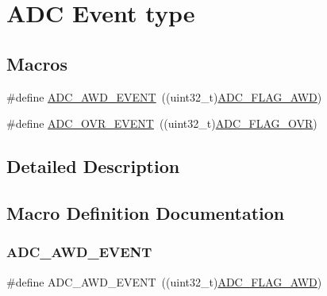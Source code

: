 \hypertarget{group___a_d_c___event__type}{}\section{A\+DC Event type}
\label{group___a_d_c___event__type}
\subsection*{Macros}
\begin{DoxyCompactItemize}
\item 
\#define \hyperlink{group___a_d_c___event__type_ga2d1d545ea1bfecba7a7081be6ef2cb93}{A\+D\+C\+\_\+\+A\+W\+D\+\_\+\+E\+V\+E\+NT}~((uint32\+\_\+t)\hyperlink{group___a_d_c__flags__definition_gadb75a4b430fb84950232b7a8f3a6a877}{A\+D\+C\+\_\+\+F\+L\+A\+G\+\_\+\+A\+WD})
\item 
\#define \hyperlink{group___a_d_c___event__type_gae1ef5aaecb2d24cac50a59f1bc311221}{A\+D\+C\+\_\+\+O\+V\+R\+\_\+\+E\+V\+E\+NT}~((uint32\+\_\+t)\hyperlink{group___a_d_c__flags__definition_ga6e8f399d2af342bd18b9f5803cb986e7}{A\+D\+C\+\_\+\+F\+L\+A\+G\+\_\+\+O\+VR})
\end{DoxyCompactItemize}


\subsection{Detailed Description}


\subsection{Macro Definition Documentation}
\mbox{\label{group___a_d_c___event__type_ga2d1d545ea1bfecba7a7081be6ef2cb93}} 
\subsubsection{\texorpdfstring{A\+D\+C\+\_\+\+A\+W\+D\+\_\+\+E\+V\+E\+NT}{ADC\_AWD\_EVENT}}
{\footnotesize\ttfamily \#define A\+D\+C\+\_\+\+A\+W\+D\+\_\+\+E\+V\+E\+NT~((uint32\+\_\+t)\hyperlink{group___a_d_c__flags__definition_gadb75a4b430fb84950232b7a8f3a6a877}{A\+D\+C\+\_\+\+F\+L\+A\+G\+\_\+\+A\+WD})}

